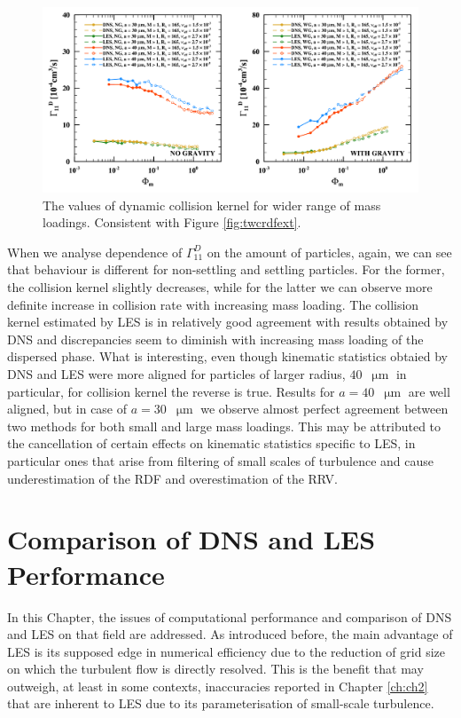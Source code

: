 \documentclass{pracamgren}
\begin{document}
\begin{figure}[h]
\centering
\includegraphics[width=13.5cm]{figures/2-13_twcgammaext.pdf}
\caption{
The values of dynamic collision kernel for wider range of mass loadings.
Consistent with Figure \ref{fig:twcrdfext}.
}
\label{fig:twcgammaext}
\end{figure}

When we analyse dependence of $\Gamma^D_{11}$ on the amount of particles, again, we can see that behaviour is different for non-settling and settling particles.
For the former, the collision kernel slightly decreases, while for the latter we can observe more definite increase in collision rate with increasing mass loading.
The collision kernel estimated by LES is in relatively good agreement with results obtained by DNS and discrepancies seem to diminish with increasing mass loading of the dispersed phase.
What is interesting, even though kinematic statistics obtaied by DNS and LES were more aligned for particles of larger radius, $40$~$\upmu\text{m}$ in particular, for collision kernel the reverse is true.
Results for $a = 40$~$\upmu\text{m}$ are well aligned, but in case of $a = 30$~$\upmu\text{m}$ we observe almost perfect agreement between two methods for both small and large mass loadings.
This may be attributed to the cancellation of certain effects on kinematic statistics specific to LES, in particular ones that arise from filtering of small scales of turbulence and cause underestimation of the RDF and overestimation of the RRV.



\chapter{Comparison of DNS and LES Performance}
\label{ch:ch3}

In this Chapter, the issues of computational performance and comparison of DNS and LES on that field are addressed.
As introduced before, the main advantage of LES is its supposed edge in numerical efficiency due to the reduction of grid size on which the turbulent flow is directly resolved.
This is the benefit that may outweigh, at least in some contexts, inaccuracies reported in Chapter \ref{ch:ch2} that are inherent to LES due to its parameterisation of small-scale turbulence.
\end{document}
